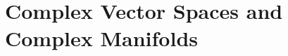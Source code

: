 \documentclass[../main]{subfiles}
\begin{document}
\chapter{Complex Vector Spaces and Complex Manifolds}\label{ch:13}

\end{document}
